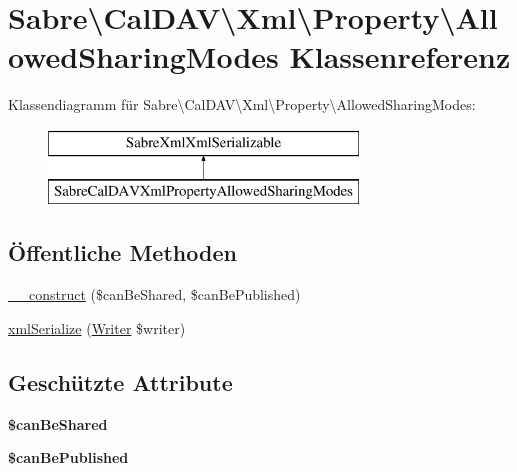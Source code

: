 \hypertarget{class_sabre_1_1_cal_d_a_v_1_1_xml_1_1_property_1_1_allowed_sharing_modes}{}\section{Sabre\textbackslash{}Cal\+D\+AV\textbackslash{}Xml\textbackslash{}Property\textbackslash{}Allowed\+Sharing\+Modes Klassenreferenz}
\label{class_sabre_1_1_cal_d_a_v_1_1_xml_1_1_property_1_1_allowed_sharing_modes}
Klassendiagramm für Sabre\textbackslash{}Cal\+D\+AV\textbackslash{}Xml\textbackslash{}Property\textbackslash{}Allowed\+Sharing\+Modes\+:\begin{figure}[H]
\begin{center}
\leavevmode
\includegraphics[height=2.000000cm]{class_sabre_1_1_cal_d_a_v_1_1_xml_1_1_property_1_1_allowed_sharing_modes}
\end{center}
\end{figure}
\subsection*{Öffentliche Methoden}
\begin{DoxyCompactItemize}
\item 
\mbox{\hyperlink{class_sabre_1_1_cal_d_a_v_1_1_xml_1_1_property_1_1_allowed_sharing_modes_a4faf165cd45bfb74139c0a1dd925c493}{\+\_\+\+\_\+construct}} (\$can\+Be\+Shared, \$can\+Be\+Published)
\item 
\mbox{\hyperlink{class_sabre_1_1_cal_d_a_v_1_1_xml_1_1_property_1_1_allowed_sharing_modes_a82dfec410879d15223d4544694aaaf63}{xml\+Serialize}} (\mbox{\hyperlink{class_sabre_1_1_xml_1_1_writer}{Writer}} \$writer)
\end{DoxyCompactItemize}
\subsection*{Geschützte Attribute}
\begin{DoxyCompactItemize}
\item 
\mbox{\label{class_sabre_1_1_cal_d_a_v_1_1_xml_1_1_property_1_1_allowed_sharing_modes_a4eac57f892c8af2fbc3d0ff0a31e4131}} 
{\bfseries \$can\+Be\+Shared}
\item 
\mbox{\label{class_sabre_1_1_cal_d_a_v_1_1_xml_1_1_property_1_1_allowed_sharing_modes_a35d9e47dedd80248a2020fcc5002899c}} 
{\bfseries \$can\+Be\+Published}
\end{DoxyCompactItemize}


